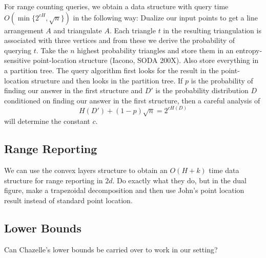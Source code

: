 \documentclass{article}
\begin{document}
For range counting queries, we obtain a data structure with query time
$O(\min\{2^{cH},\sqrt{n}\})$ in the following way:  Dualize our input
points to get a line arrangement $A$ and triangulate $A$.  Each
triangle $t$ in the resulting triangulation is associated with three
vertices and from these we derive the probability of querying $t$.
Take the $n$ highest probability triangles and store them in an
entropy-sensitive point-location structure (Iacono, SODA 200X).  Also
store everything in a partition tree.  The query algorithm first looks
for the result in the point-location structure and then looks in the
partition tree. If $p$ is the probability of finding our answer in the
first structure and $D'$ is the probability distribution $D$
conditioned on finding our answer in the first structure, then a careful analysis of
\[
     H(D') + (1-p)\sqrt{n} = 2^{cH(D)}
\]
will determine the constant $c$.

\subsection{Range Reporting}

We can use the convex layers structure to obtain an $O(H+k)$ time data
structure for range reporting in $2d$.  Do exactly what they do, but
in the dual figure, make a trapezoidal decomposition and then use
John's point location result instead of standard point location.

\subsection{Lower Bounds}

Can Chazelle's lower bounds be carried over to work in our setting?
\end{document}
